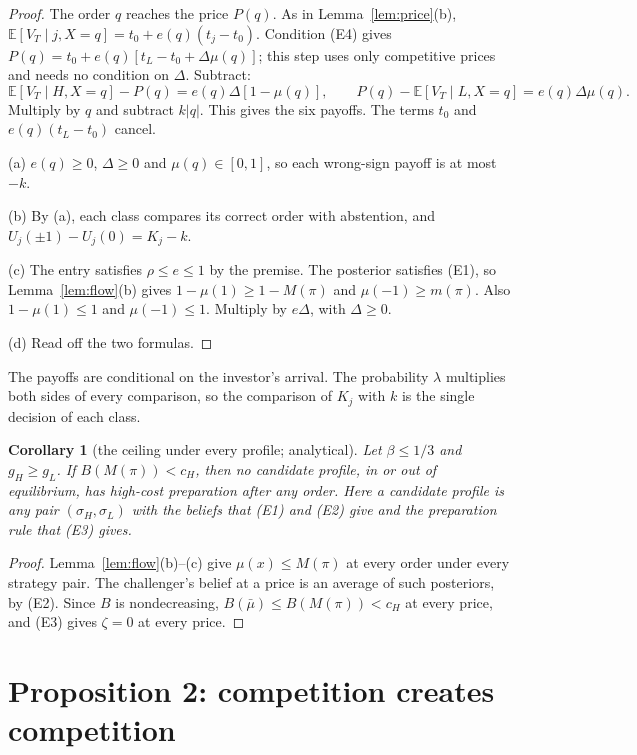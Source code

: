 \documentclass[11pt]{article}
\newtheorem{corollary}{Corollary}
\theoremstyle{definition}
\newcommand{\E}{\mathbb E}
\begin{document}
\begin{proof}
The order $q$ reaches the price $P(q)$. As in Lemma~\ref{lem:price}(b), $\E[V_T\mid j,X=q]=t_0+e(q)(t_j-t_0)$.
Condition (E4) gives $P(q)=t_0+e(q)[t_L-t_0+\Delta\mu(q)]$; this step uses only competitive prices and
needs no condition on $\Delta$. Subtract:
\[
\E[V_T\mid H,X=q]-P(q)=e(q)\Delta[1-\mu(q)],\qquad P(q)-\E[V_T\mid L,X=q]=e(q)\Delta\mu(q).
\]
Multiply by $q$ and subtract $k|q|$. This gives the six payoffs. The terms $t_0$ and $e(q)(t_L-t_0)$ cancel.

(a) $e(q)\ge0$, $\Delta\ge0$ and $\mu(q)\in[0,1]$, so each wrong-sign payoff is at most $-k$.

(b) By (a), each class compares its correct order with abstention, and $U_j(\pm1)-U_j(0)=K_j-k$.

(c) The entry satisfies $\rho\le e\le1$ by the premise. The posterior satisfies (E1), so
Lemma~\ref{lem:flow}(b) gives $1-\mu(1)\ge1-M(\pi)$ and $\mu(-1)\ge m(\pi)$. Also $1-\mu(1)\le1$ and $\mu(-1)\le1$.
Multiply by $e\Delta$, with $\Delta\ge0$.

(d) Read off the two formulas.
\end{proof}

The payoffs are conditional on the investor's arrival. The probability $\lambda$ multiplies both sides of every
comparison, so the comparison of $K_j$ with $k$ is the single decision of each class.

\begin{corollary}[the ceiling under every profile; analytical]\label{cor:ceiling}
Let $\beta\le1/3$ and $g_H\ge g_L$. If $B(M(\pi))<c_H$, then no candidate profile, in or out of equilibrium,
has high-cost preparation after any order. Here a candidate profile is any pair $(\sigma_H,\sigma_L)$ with the
beliefs that (E1) and (E2) give and the preparation rule that (E3) gives.
\end{corollary}

\begin{proof}
Lemma~\ref{lem:flow}(b)--(c) give $\mu(x)\le M(\pi)$ at every order under every strategy pair. The challenger's
belief at a price is an average of such posteriors, by (E2). Since $B$ is nondecreasing,
$B(\bar\mu)\le B(M(\pi))<c_H$ at every price, and (E3) gives $\zeta=0$ at every price.
\end{proof}

\section{Proposition 2: competition creates competition}\label{sec:prop2}
\end{document}
